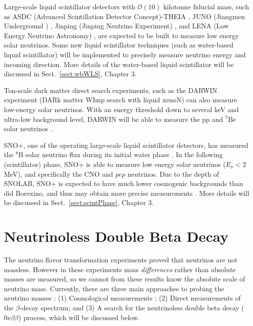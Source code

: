 Large-scale liquid scintillator detectors with $\mathcal{O}(10)$ kilotonne fiducial mass, such as ASDC (Advanced Scintillation Detector Concept)-THEIA \cite{askins2020theia}, JUNO (Jiangmen Underground ) \cite{giaz2018status}, Jinping (Jinping Neutrino Experiment) \cite{beacom2017physics}, and LENA (Low Energy Neutrino Astronomy) \cite{wurm2013studying}, are expected to be built to measure low energy solar neutrinos. Some new liquid scintillator techniques (such as water-based liquid scintillator) will be implemented to precisely measure neutrino energy and incoming direction. More details of the water-based liquid scintillator will be discussed in Sect.~\ref{sect:wbWLS}, Chapter 3.

Ton-scale dark matter direct search experiments, such as the DARWIN experiment (DARk matter WImp search with liquid xenoN) can also measure low-energy solar neutrinos. With an energy threshold down to several keV and ultra-low background level, DARWIN will be able to measure the pp and $^7$Be solar neutrinos \cite{baudis2014neutrino,aalbers2016darwin,aalbers2020solar}.

SNO+, one of the operating large-scale liquid scintillator detectors, has measured the $^8$B solar neutrino flux during its initial water phase \cite{anderson2019measurement}. In the following (scintillator) phase, SNO+ is able to measure low energy solar neutrinos ($E_\nu<2$ MeV), and specifically the CNO and $pep$ neutrinos. Due to the depth of SNOLAB, SNO+ is expected to have much lower cosmogenic backgrounds than did Borexino, and thus may obtain more precise measurements \cite{directorReview}. More details will be discussed in Sect.~\ref{sect:scintPhase}, Chapter 3.

\section{Neutrinoless Double Beta Decay}\label{sect:doublebeta}

The neutrino flavor transformation experiments proved that neutrinos are not massless. However in these experiments mass {\em differences} rather than absolute masses are measured, so we cannot from these results know the absolute scale of neutrino mass. Currently, there are three main approaches to probing the neutrino masses \cite{valle2015neutrinos}: (1) Cosmological measurements \cite{aghanim2020planck,dvorkin2019neutrino,lesgourgues2013neutrino}; (2) Direct measurements of the $\beta$-decay spectrum; and (3) A search for the neutrinoless double beta decay ($0\nu\beta\beta$) process, which will be discussed below.

